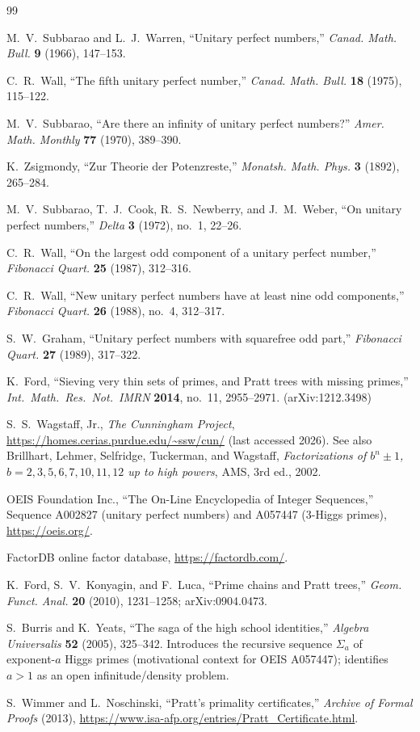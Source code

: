 \documentclass[11pt]{amsart}
\theoremstyle{plain}
\theoremstyle{definition}
\begin{document}
\begin{thebibliography}{99}

M.~V.~Subbarao and L.~J.~Warren,
``Unitary perfect numbers,''
\emph{Canad. Math. Bull.} \textbf{9} (1966), 147--153.

C.~R.~Wall,
``The fifth unitary perfect number,''
\emph{Canad. Math. Bull.} \textbf{18} (1975), 115--122.

M.~V.~Subbarao,
``Are there an infinity of unitary perfect numbers?''
\emph{Amer. Math. Monthly} \textbf{77} (1970), 389--390.

K.~Zsigmondy,
``Zur Theorie der Potenzreste,''
\emph{Monatsh. Math. Phys.} \textbf{3} (1892), 265--284.

M.~V.~Subbarao, T.~J.~Cook, R.~S.~Newberry, and J.~M.~Weber,
``On unitary perfect numbers,''
\emph{Delta} \textbf{3} (1972), no.~1, 22--26.

C.~R.~Wall,
``On the largest odd component of a unitary perfect number,''
\emph{Fibonacci Quart.} \textbf{25} (1987), 312--316.

C.~R.~Wall,
``New unitary perfect numbers have at least nine odd components,''
\emph{Fibonacci Quart.} \textbf{26} (1988), no.~4, 312--317.

S.~W.~Graham,
``Unitary perfect numbers with squarefree odd part,''
\emph{Fibonacci Quart.} \textbf{27} (1989), 317--322.

K.~Ford,
``Sieving very thin sets of primes, and Pratt trees with missing
primes,''
\emph{Int.~Math.~Res.~Not.~IMRN} \textbf{2014}, no.~11, 2955--2971.
(arXiv:1212.3498)

S.~S.~Wagstaff, Jr.,
\emph{The Cunningham Project},
\url{https://homes.cerias.purdue.edu/~ssw/cun/} (last accessed 2026).
See also Brillhart, Lehmer, Selfridge, Tuckerman, and Wagstaff,
\emph{Factorizations of $b^n \pm 1$, $b=2,3,5,6,7,10,11,12$ up to high
powers}, AMS, 3rd ed., 2002.

OEIS Foundation Inc.,
``The On-Line Encyclopedia of Integer Sequences,''
Sequence A002827 (unitary perfect numbers) and A057447 (3-Higgs primes),
\url{https://oeis.org/}.

FactorDB online factor database, \url{https://factordb.com/}.

K.~Ford, S.~V.~Konyagin, and F.~Luca,
``Prime chains and Pratt trees,''
\emph{Geom. Funct. Anal.} \textbf{20} (2010), 1231--1258;
arXiv:0904.0473.

S.~Burris and K.~Yeats,
``The saga of the high school identities,''
\emph{Algebra Universalis} \textbf{52} (2005), 325--342.
Introduces the recursive sequence $\Sigma_a$ of exponent-$a$ Higgs
primes (motivational context for OEIS A057447); identifies $a > 1$
as an open infinitude/density problem.

S.~Wimmer and L.~Noschinski,
``Pratt's primality certificates,''
\emph{Archive of Formal Proofs} (2013),
\url{https://www.isa-afp.org/entries/Pratt_Certificate.html}.

\end{thebibliography}
\end{document}
